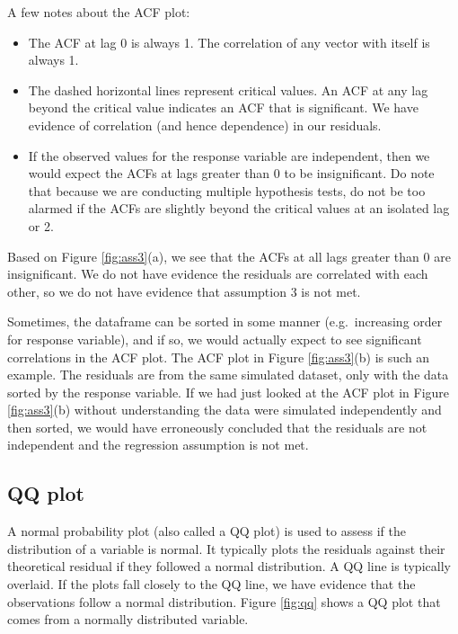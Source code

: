 \documentclass[
]{book}
\providecommand{\tightlist}{%
  \setlength{\itemsep}{0pt}\setlength{\parskip}{0pt}}
\begin{document}
A few notes about the ACF plot:

\begin{itemize}
\tightlist
\item
  The ACF at lag 0 is always 1. The correlation of any vector with itself is always 1.
\item
  The dashed horizontal lines represent critical values. An ACF at any lag beyond the critical value indicates an ACF that is significant. We have evidence of correlation (and hence dependence) in our residuals.
\item
  If the observed values for the response variable are independent, then we would expect the ACFs at lags greater than 0 to be insignificant. Do note that because we are conducting multiple hypothesis tests, do not be too alarmed if the ACFs are slightly beyond the critical values at an isolated lag or 2.
\end{itemize}

Based on Figure \ref{fig:ass3}(a), we see that the ACFs at all lags greater than 0 are insignificant. We do not have evidence the residuals are correlated with each other, so we do not have evidence that assumption 3 is not met.

Sometimes, the dataframe can be sorted in some manner (e.g.~increasing order for response variable), and if so, we would actually expect to see significant correlations in the ACF plot. The ACF plot in Figure \ref{fig:ass3}(b) is such an example. The residuals are from the same simulated dataset, only with the data sorted by the response variable. If we had just looked at the ACF plot in Figure \ref{fig:ass3}(b) without understanding the data were simulated independently and then sorted, we would have erroneously concluded that the residuals are not independent and the regression assumption is not met.

\hypertarget{qq-plot}{%
\subsection{QQ plot}\label{qq-plot}}

A normal probability plot (also called a QQ plot) is used to assess if the distribution of a variable is normal. It typically plots the residuals against their theoretical residual if they followed a normal distribution. A QQ line is typically overlaid. If the plots fall closely to the QQ line, we have evidence that the observations follow a normal distribution. Figure \ref{fig:qq} shows a QQ plot that comes from a normally distributed variable.
\end{document}
